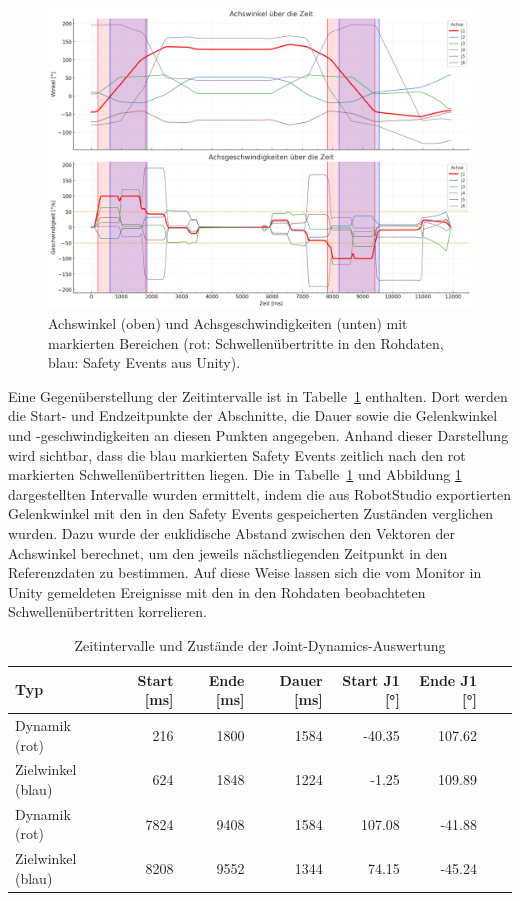 \begin{figure}[H]
	\centering
	\includegraphics[width=\textwidth]{Figures/achsgeschwindigkeitPlot.png}
	\caption{Achswinkel (oben) und Achsgeschwindigkeiten (unten) mit markierten
		Bereichen (rot: Schwellenübertritte in den Rohdaten, blau: Safety Events aus Unity).}
	\label{fig:jointdynamics}
\end{figure}

Eine Gegenüberstellung der Zeitintervalle ist in Tabelle~\ref{tab:jointdynamics} enthalten.
Dort werden die Start- und Endzeitpunkte der Abschnitte, die Dauer sowie die Gelenkwinkel
und -geschwindigkeiten an diesen Punkten angegeben. Anhand dieser Darstellung wird sichtbar,
dass die blau markierten Safety Events zeitlich nach den rot markierten Schwellenübertritten
liegen. Die in Tabelle~\ref{tab:jointdynamics} und Abbildung \ref{fig:jointdynamics} dargestellten Intervalle wurden ermittelt,
indem die aus RobotStudio exportierten Gelenkwinkel mit den in den Safety Events
gespeicherten Zuständen verglichen wurden. Dazu wurde der euklidische Abstand zwischen
den Vektoren der Achswinkel berechnet, um den jeweils nächstliegenden Zeitpunkt in
den Referenzdaten zu bestimmen. Auf diese Weise lassen sich die vom Monitor in Unity
gemeldeten Ereignisse mit den in den Rohdaten beobachteten Schwellenübertritten
korrelieren.

\begin{table}[H]
	\centering
	\small
	\begin{tabularx}{\textwidth}{lrrrrrrX}
		\toprule
		Typ               & Start [ms] & Ende [ms] & Dauer [ms] & Start J1 [°] & Ende J1 [°] \\
		\midrule
		Dynamik (rot)     & 216        & 1800      & 1584       & -40.35       & 107.62      \\
		Zielwinkel (blau) & 624        & 1848      & 1224       & -1.25        & 109.89      \\
		Dynamik (rot)     & 7824       & 9408      & 1584       & 107.08       & -41.88      \\
		Zielwinkel (blau) & 8208       & 9552      & 1344       & 74.15        & -45.24      \\
		\bottomrule
	\end{tabularx}
	\caption{Zeitintervalle und Zustände der Joint-Dynamics-Auswertung}
	\label{tab:jointdynamics}
\end{table}

